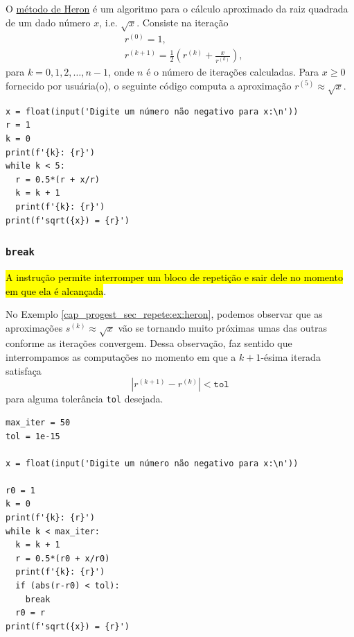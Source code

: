 \begin{ex}\label{cap_progest_sec_repete:ex:heron}
  O \href{https://en.wikipedia.org/wiki/Methods_of_computing_square_roots#Heron's_method}{método de Heron}{\heron} é um algoritmo para o cálculo aproximado da raiz quadrada de um dado número $x$, i.e. $\sqrt{x}$. Consiste na iteração
  \begin{align}
    & r^{(0)} = 1, \\
    & r^{(k+1)} = \frac{1}{2}\left(r^{(k)} + \frac{x}{r^{(k)}}\right),
  \end{align}
  para $k=0,1,2,\ldots,n-1$, onde $n$ é o número de iterações calculadas. Para $x\geq 0$ fornecido por usuária(o), o seguinte código computa a aproximação $r^{(5)}\approx \sqrt{x}$.

\begin{lstlisting}
x = float(input('Digite um número não negativo para x:\n'))
r = 1
k = 0
print(f'{k}: {r}')
while k < 5:
  r = 0.5*(r + x/r)
  k = k + 1
  print(f'{k}: {r}')
print(f'sqrt({x}) = {r}')
\end{lstlisting}

\end{ex}

\subsubsection{\texttt{break}}

\hl{A instrução {\PYTHONbreak} permite interromper um bloco de repetição e sair dele no momento em que ela é alcançada}.

\begin{ex}\label{cap_progest_sec_repete:ex:heron_break}
  No Exemplo \ref{cap_progest_sec_repete:ex:heron}, podemos observar que as aproximações $s^{(k)}\approx \sqrt{x}$ vão se tornando muito próximas umas das outras conforme as iterações convergem. Dessa observação, faz sentido que interrompamos as computações no momento em que a $k+1$-ésima iterada satisfaça
  \begin{equation}
    \left|r^{(k+1)}-r^{(k)}\right| < \texttt{tol}
  \end{equation}
  para alguma tolerância \lstinline+tol+ desejada.

\begin{lstlisting}
max_iter = 50
tol = 1e-15

x = float(input('Digite um número não negativo para x:\n'))

r0 = 1
k = 0
print(f'{k}: {r}')
while k < max_iter:
  k = k + 1
  r = 0.5*(r0 + x/r0)
  print(f'{k}: {r}')
  if (abs(r-r0) < tol):
    break
  r0 = r
print(f'sqrt({x}) = {r}')
\end{lstlisting}

\end{ex}

